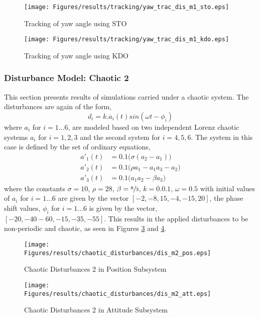 \documentclass{article}
\begin{document}
\begin{figure}[H]
\centering
\texttt{[image: Figures/results/tracking/yaw\_trac\_dis\_m1\_sto.eps]}
\caption{Tracking of yaw angle using STO}
\label{yaw_trac_dis_m1_sto}
\end{figure}

\begin{figure}[H]
\centering
\texttt{[image: Figures/results/tracking/yaw\_trac\_dis\_m1\_kdo.eps]}
\caption{Tracking of yaw angle using KDO}
\label{yaw_trac_dis_m1_kdo}
\end{figure}

\subsubsection{Disturbance Model: Chaotic 2}
This section presents results of simulations carried under a chaotic system. The disturbances are again of the form,
\begin{equation}
d_i = k.a_i(t)sin(\omega t-\phi_i)
\end{equation}
where $a_i$ for $i=1...6$, are modeled based on two independent Lorenz chaotic systems $a_i$ for $i=1,2,3$ and the second system for $i=4,5,6$. The system in this case is defined by the set of ordinary equations, 
\begin{subequations}
\begin{align}
a'_1(t) &= 0.1\big(\sigma(a_2-a_1)\big)\\
a'_2(t) &= 0.1\big(\rho a_1 - a_1 a_3 - a_2\big)\\
a'_3(t) &= 0.1\big(a_1 a_2 - \beta a_3\big)
\end{align}
\end{subequations}
where the constants $\sigma=10$, $\rho=28$, $\beta=\sfrac{8}{3}$, $k=0.0.1$, $\omega=0.5$ with initial values of $a_i$ for $i=1...6$ are given by the vector $[-2,-8,15,-4,-15,20]$, the phase shift values, $\phi_i$ for $i=1...6$ is given by the vector, $[-20,-40-60,-15,-35,-55]$. This results in the applied disturbances to be non-periodic and chaotic, as seen in Figures \ref{dis_m2_pos} and \ref{dis_m2_att}.

\begin{figure}[H]
\centering
\texttt{[image: Figures/results/chaotic\_disturbances/dis\_m2\_pos.eps]}
\caption{Chaotic Disturbances 2 in Position Subsystem}
\label{dis_m2_pos}
\end{figure}

\begin{figure}[H]
\centering
\texttt{[image: Figures/results/chaotic\_disturbances/dis\_m2\_att.eps]}
\caption{Chaotic Disturbances 2 in Attitude Subsystem}
\label{dis_m2_att}
\end{figure}
\end{document}
